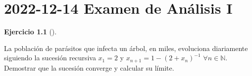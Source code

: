 \documentclass[
  spanish,
  a4paper,
]{scrreport}
\theoremstyle{definition}
\newtheorem{exercise}{Ejercicio}[chapter]
\theoremstyle{remark}
\begin{document}

\chapter{\texorpdfstring{2022-12-14 Examen de Análisis
I}{2022-12-14  Examen de Análisis I}}\label{examen-de-anuxe1lisis-i-1}

\begin{exercise}[]\protect\hypertarget{exr-1}{}\label{exr-1}

La población de parásitos que infecta un árbol, en miles, evoluciona
diariamente siguiendo la sucesión recursiva \(x_1=2\) y
\(x_{n+1}=1-(2+x_n)^{-1}\) \(\forall n\in\mathbb{N}\). Demostrar que la
sucesión converge y calcular su límite.

\end{exercise}
\end{document}
